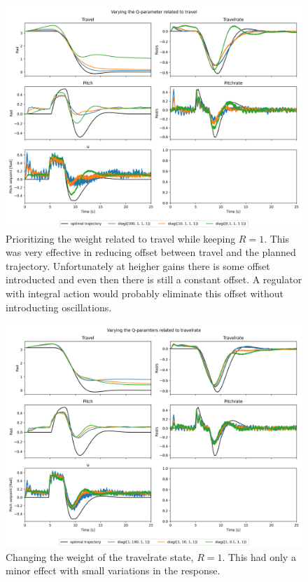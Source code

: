 \documentclass[../main.tex]{subfiles}
\begin{document}
\begin{figure}[h]
	\centering
	\includegraphics[width=0.8\linewidth]{figures/LAB3_Q_variations.png}
	\caption{Prioritizing the weight related to travel while keeping $R=1$. This was very effective in reducing offset between travel and the planned trajectory. Unfortunately at heigher gains there is some offset introducted and even then there is still a constant offset. A regulator with integral action would probably eliminate this offset without introducting oscillations.}
	\label{fig:LAB3_Q_variations_travel}
\end{figure}

\begin{figure}[h]
	\centering
	\includegraphics[width=0.8\linewidth]{figures/LAB3_Q_variations_travelrate.png}
	\caption{Changing the weight of the travelrate state, $R=1$. This had only a minor effect with small variations in the response.}
	\label{fig:LAB3_Q_variations_travelrate}
\end{figure}
\end{document}
